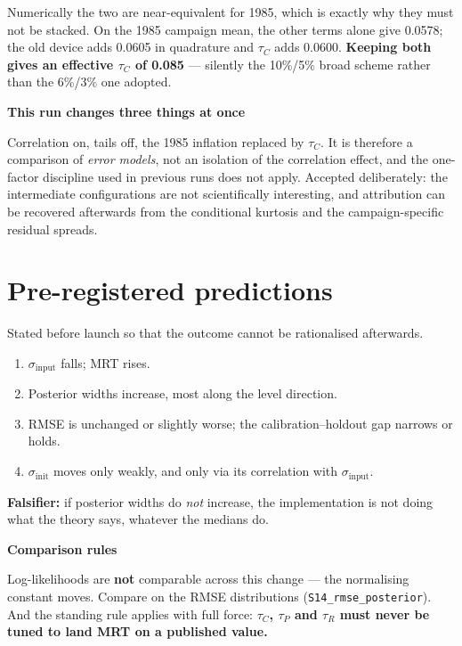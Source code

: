 \documentclass[11pt]{article}
\newenvironment{warnbox}[1][]{%
  \begin{leftbar}\noindent\textcolor{red!60!black}{\textbf{\small #1}}\par\vspace{0.3em}\small}{\end{leftbar}}
\begin{document}
Numerically the two are near-equivalent for 1985, which is exactly why they must not be
stacked. On the 1985 campaign mean, the other terms alone give 0.0578; the old device
adds 0.0605 in quadrature and $\tau_C$ adds 0.0600. \textbf{Keeping both gives an
effective $\tau_C$ of 0.085} --- silently the 10\%/5\% broad scheme rather than the
6\%/3\% one adopted.

\begin{warnbox}[This run changes three things at once]
Correlation on, tails off, the 1985 inflation replaced by $\tau_C$. It is therefore a comparison of
\emph{error models}, not an isolation of the correlation effect, and the one-factor
discipline used in previous runs does not apply. Accepted deliberately: the
intermediate configurations are not scientifically interesting, and attribution can
be recovered afterwards from the conditional kurtosis and the campaign-specific
residual spreads.
\end{warnbox}

\section{Pre-registered predictions}

Stated before launch so that the outcome cannot be rationalised afterwards.

\begin{enumerate}[nosep]
\item $\sigma_{\text{input}}$ falls; MRT rises.
\item Posterior widths increase, most along the level direction.
\item RMSE is unchanged or slightly worse; the calibration--holdout gap narrows or
      holds.
\item $\sigma_{\text{init}}$ moves only weakly, and only via its correlation with
      $\sigma_{\text{input}}$.
\end{enumerate}

\textbf{Falsifier:} if posterior widths do \emph{not} increase, the implementation is
not doing what the theory says, whatever the medians do.

\begin{warnbox}[Comparison rules]
Log-likelihoods are \textbf{not} comparable across this change --- the normalising
constant moves. Compare on the RMSE distributions
(\texttt{S14\_rmse\_posterior}). And the standing rule applies with full force:
\textbf{$\tau_C$, $\tau_P$ and $\tau_R$ must never be tuned to land MRT on a
published value.}
\end{warnbox}
\end{document}
